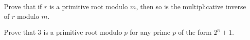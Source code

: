 \documentclass{subfile}
\begin{document}
	\begin{problem}
		Prove that if $r$ is a primitive root modulo $m$, then so is the multiplicative inverse of $r$ modulo $m$. %
	\end{problem}


	\begin{problem}
		Prove that $3$ is a primitive root modulo $p$ for any prime $p$ of the form $2^n+1$. %
	\end{problem}
\end{document}
